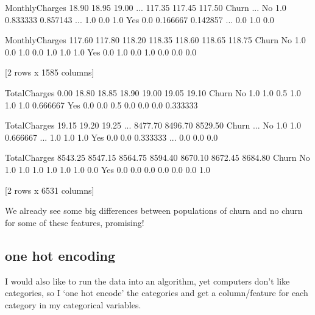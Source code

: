 \documentclass[letterpaper,10pt,english]{jupyterBook}
\begin{document}
\begin{sphinxVerbatim}[commandchars=\\\{\}]
MonthlyCharges  18.90     18.95     19.00   ...  117.35  117.45  117.50  \PYGZbs{}
Churn                                       ...                           
No                 1.0  0.833333  0.857143  ...     1.0     0.0     1.0   
Yes                0.0  0.166667  0.142857  ...     0.0     1.0     0.0   

MonthlyCharges  117.60  117.80  118.20  118.35  118.60  118.65  118.75  
Churn                                                                   
No                 1.0     0.0     1.0     0.0     1.0     1.0     1.0  
Yes                0.0     1.0     0.0     1.0     0.0     0.0     0.0  

[2 rows x 1585 columns]

TotalCharges  0.00     18.80    18.85    18.90    19.00    19.05     19.10    \PYGZbs{}
Churn                                                                          
No                1.0      1.0      0.5      1.0      1.0      1.0  0.666667   
Yes               0.0      0.0      0.5      0.0      0.0      0.0  0.333333   

TotalCharges  19.15    19.20     19.25    ...  8477.70  8496.70  8529.50  \PYGZbs{}
Churn                                     ...                              
No                1.0      1.0  0.666667  ...      1.0      1.0      1.0   
Yes               0.0      0.0  0.333333  ...      0.0      0.0      0.0   

TotalCharges  8543.25  8547.15  8564.75  8594.40  8670.10  8672.45  8684.80  
Churn                                                                        
No                1.0      1.0      1.0      1.0      1.0      1.0      0.0  
Yes               0.0      0.0      0.0      0.0      0.0      0.0      1.0  

[2 rows x 6531 columns]
\end{sphinxVerbatim}

\sphinxAtStartPar
We already see some big differences between populations of churn and no churn for some of these features, promising!


\subsection{one hot encoding}
\label{\detokenize{c7_case_studies/Churn:one-hot-encoding}}
\sphinxAtStartPar
I would also like to run the data into an algorithm, yet computers don’t like categories, so I ‘one hot encode’ the categories and get a column/feature for each category in my categorical variables.
\end{document}
